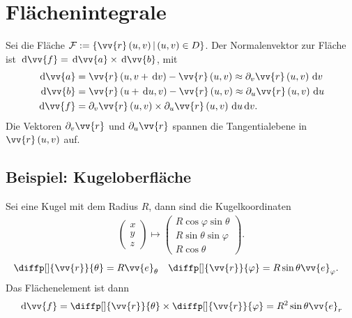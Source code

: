 \documentclass[a4paper,12pt]{article}
\newcommand{\td}{\,\text{d}}
\numberwithin{equation}{section}
\begin{document}
\newpage
\section{Flächenintegrale}
Sei die Fläche $\mathcal{F}:=\left\{\vv{r}\left(u,v\right)|\left(u,v\right) \in D\right\}$. Der Normalenvektor zur Fläche ist $\td \vv{f}=\td \vv{a}\times \td \vv{b}$, mit
\begin{align} 
        \td \vv{a}&=\vv{r}\left(u,v+\td v\right)-\vv{r}\left(u,v\right)\approx \partial_v \vv{r}\left(u,v\right)\td v\\
        \td \vv{b}&=\vv{r}\left(u+\td u,v\right)-\vv{r}\left(u,v\right)\approx \partial_u \vv{r}\left(u,v\right)\td u\\
        \td \vv{f}&=\partial_v \vv{r}\left(u,v\right)\times \partial_u\vv{r}\left(u,v\right)\td u\td v
.\end{align} 
Die Vektoren $\partial_v \vv{r}$ und $\partial_u \vv{r}$ spannen die Tangentialebene in $\vv{r}\left(u,v\right)$ auf.

\subsection{Beispiel: Kugeloberfläche}
Sei eine Kugel mit dem Radius $R$, dann sind die Kugelkoordinaten
\begin{align} 
        \begin{pmatrix}
                x\\y\\z
        \end{pmatrix}\mapsto \begin{pmatrix}
                R\cos \varphi \sin \theta \\R\sin \theta \sin \varphi \\R\cos \theta 
        \end{pmatrix}
.\end{align} 
\begin{align} 
        \diffp[]{\vv{r}}{\theta }&=R\vv{e}_\theta &\diffp[]{\vv{r}}{\varphi }&=R\sin \theta \vv{e}_\varphi 
.\end{align} 
Das Flächenelement ist dann
\begin{align} 
        \td \vv{f}=\diffp[]{\vv{r}}{\theta }\times \diffp[]{\vv{r}}{\varphi }=R^2\sin \theta \vv{e}_r
\end{align} 



\end{document}
